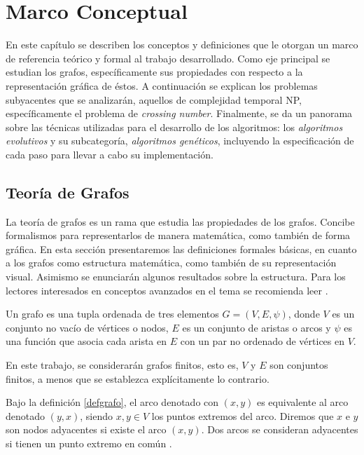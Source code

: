 \chapter{Marco Conceptual}\label{cap2}


En este capítulo se describen los conceptos y definiciones que le otorgan un marco de referencia teórico y formal al trabajo desarrollado. Como eje principal se estudian los grafos, específicamente sus propiedades con respecto a la representación gráfica de éstos. A continuación se explican los problemas subyacentes que se analizarán, aquellos de complejidad temporal NP, específicamente el problema de \emph{crossing number}. Finalmente, se da un panorama sobre las técnicas utilizadas para el desarrollo de los algoritmos: los \emph{algoritmos evolutivos} y su subcategoría, \emph{algoritmos genéticos}, incluyendo la especificación de cada paso para llevar a cabo su implementación.

\section{Teoría de Grafos}
\label{sec:teoria_grafos}
La teoría de grafos es un rama que estudia las propiedades de los grafos. Concibe formalismos para representarlos de manera matemática, como también de forma gráfica. En esta sección presentaremos las definiciones  formales básicas, en cuanto a los grafos como   estructura matemática,  como también de su representación visual. Asimismo se enunciarán algunos resultados sobre la estructura. Para los lectores interesados en conceptos avanzados en el tema se recomienda leer \cite{gersting2007mathematical,bondy1976graph,godsil2013algebraic,bollobas2013modern,nishizeki2004planar}.


\begin{definition}\label{defgrafo}\cite{bondy1976graph,gersting2007mathematical}
Un grafo es una tupla  ordenada de tres elementos  $G=(V,E,\psi)$, donde $V$  es un conjunto no  vacío de vértices o nodos, $E$ es un conjunto de aristas o arcos  y $\psi$ es  una función que asocia cada arista en $E$ con un par no ordenado de vértices en $V$.
\end{definition}
En este trabajo, se considerarán  grafos finitos,  esto es,  $V$ y $E$ son conjuntos finitos, a menos que se establezca explícitamente lo  contrario. 

Bajo  la definición \ref{defgrafo}, el arco denotado con $(x,y)$ es equivalente al arco  denotado $(y,x)$,  siendo  $x,y\in V$ los  puntos extremos del arco. Diremos que $x$ e $y$ son  nodos adyacentes si existe el arco $(x,y)$. Dos arcos se consideran adyacentes  si tienen un punto extremo en común \cite{bollobas2013modern}.

